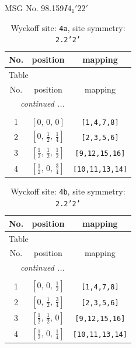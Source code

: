 \documentclass[fleqn,8pt]{jsarticle}
\begin{document}
\setcounter{MaxMatrixCols}{32}

\renewcommand{\tablename}{Table~}
\renewcommand{\figurename}{Figure~}
\begin{center}
\LARGE
MSG No. 98.159\quad$I4_{1}'22'$
\end{center}
\renewcommand{\arraystretch}{1.2}
\begin{longtable}{ccc}
\caption{Wyckoff site: {\tt 4a}, site symmetry: {\tt 2.2'2'}}
 \\
 \hline \hline
No. & position & mapping \\ \hline \endfirsthead

\multicolumn{2}{l}{\tablename\ \thetable{}} \\
 \hline \hline
No. & position & mapping \\ \hline \endhead

 \hline \hline
\multicolumn{2}{r}{\footnotesize\it continued ...} \\ \endfoot

 \hline \hline
\multicolumn{2}{r}{} \\ \endlastfoot

1 & $\left[ 0,\, 0,\, 0 \right]$ & {\tt [1,4,7,8]} \\ \hline
2 & $\left[ 0,\, \frac{1}{2},\, \frac{1}{4} \right]$ & {\tt [2,3,5,6]} \\ \hline
3 & $\left[ \frac{1}{2},\, \frac{1}{2},\, \frac{1}{2} \right]$ & {\tt [9,12,15,16]} \\ \hline
4 & $\left[ \frac{1}{2},\, 0,\, \frac{3}{4} \right]$ & {\tt [10,11,13,14]} \\
\end{longtable}
\renewcommand{\arraystretch}{1.2}
\begin{longtable}{ccc}
\caption{Wyckoff site: {\tt 4b}, site symmetry: {\tt 2.2'2'}}
 \\
 \hline \hline
No. & position & mapping \\ \hline \endfirsthead

\multicolumn{2}{l}{\tablename\ \thetable{}} \\
 \hline \hline
No. & position & mapping \\ \hline \endhead

 \hline \hline
\multicolumn{2}{r}{\footnotesize\it continued ...} \\ \endfoot

 \hline \hline
\multicolumn{2}{r}{} \\ \endlastfoot

1 & $\left[ 0,\, 0,\, \frac{1}{2} \right]$ & {\tt [1,4,7,8]} \\ \hline
2 & $\left[ 0,\, \frac{1}{2},\, \frac{3}{4} \right]$ & {\tt [2,3,5,6]} \\ \hline
3 & $\left[ \frac{1}{2},\, \frac{1}{2},\, 0 \right]$ & {\tt [9,12,15,16]} \\ \hline
4 & $\left[ \frac{1}{2},\, 0,\, \frac{1}{4} \right]$ & {\tt [10,11,13,14]} \\
\end{longtable}
\end{document}

